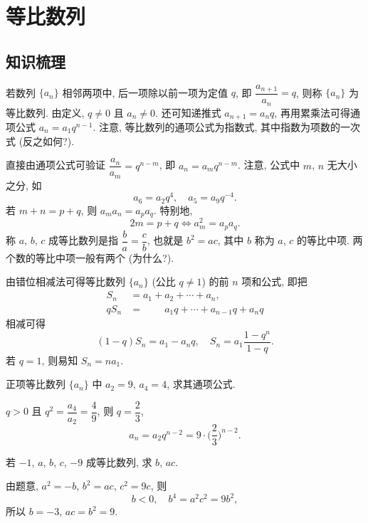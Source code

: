 
\section{等比数列}

\subsection{知识梳理}

若数列 $\{a_n\}$ 相邻两项中, 后一项除以前一项为定值 $q$, 即 $\dfrac{a_{n+1}}{a_n}=q$, 则称 $\{a_n\}$ 为等比数列. 由定义, $q\neq0$ 且 $a_n\neq 0$. 还可知递推式 $a_{n+1}=a_n q$, 再用累乘法可得通项公式 $a_n=a_1 q^{n-1}$. 注意, 等比数列的通项公式为指数式, 其中指数为项数的一次式 (反之如何?).

直接由通项公式可验证 $\dfrac{a_n}{a_m}=q^{n-m}$, 即 $a_n=a_m q^{n-m}$. 注意, 公式中 $m$, $n$ 无大小之分, 如
\[a_6= a_2q^4,\quad a_5= a_9 q^{-4}.\]
若 $m+n=p+q$, 则 $a_m a_n=a_p a_q$. 特别地, 
\[2m=p+q \Leftrightarrow a_m^2=a_p a_q.\]
称 $a$, $b$, $c$ 成等比数列是指 $\dfrac{b}{a}= \dfrac{c}b$, 也就是 $b^2=ac$, 其中 $b$ 称为 $a$, $c$ 的等比中项. 两个数的等比中项一般有两个 (为什么?).

由错位相减法可得等比数列 $\{a_n\}$ (公比 $q\neq 1$) 的前 $n$ 项和公式, 即把
\begin{align*}
    S_n&= a_1+a_2+\cdots+a_n,\\
    qS_n&= \phantom{a_1+{}}a_1q+\cdots+a_{n-1}q+a_nq
\end{align*}
相减可得
\[(1-q)S_n= a_1-a_nq,\quad S_n=a_1\frac{1-q^n}{1-q}.\]
若 $q=1$, 则易知 $S_n=na_1$.

\lianxi
\begin{exercise}
    正项等比数列 $\{a_n\}$ 中 $a_2=9$, $a_4=4$, 求其通项公式.
\end{exercise}
\beginsolution
    $q>0$ 且 $q^2= \dfrac{a_4}{a_2}= \dfrac49$, 则 $q= \dfrac23$,
    \[a_n= a_2 q^{n-2}
        = 9\cdot\biggl(\frac23\biggr)^{n-2}.\]
\endsolution

\begin{exercise}
    若 $-1$, $a$, $b$, $c$, $-9$ 成等比数列, 求 $b$, $ac$.
\end{exercise}
\beginsolution
    由题意, $a^2= -b$, $b^2= ac$, $c^2= 9c$, 则
    \[b<0,\quad b^4= a^2c^2= 9b^2,\]
    所以 $b=-3$, $ac=b^2=9$.
\endsolution

